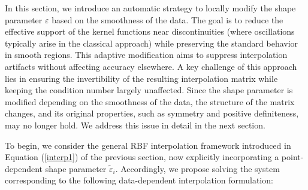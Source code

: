 \documentclass[preprint]{elsarticle}       %
\begin{document}


In this section, we introduce an automatic strategy to locally modify the shape parameter $\varepsilon$ based on the smoothness of the data. The goal is to reduce the effective support of the kernel functions near discontinuities (where oscillations typically arise in the classical approach) while preserving the standard behavior in smooth regions. This adaptive modification aims to suppress interpolation artifacts without affecting accuracy elsewhere. A key challenge of this approach lies in ensuring the invertibility of the resulting interpolation matrix while keeping the condition number largely unaffected. Since the shape parameter is modified depending on the smoothness of the data, the structure of the matrix changes, and its original properties, such as symmetry and positive definiteness, may no longer hold. We address this issue in detail in the next section.

To begin, we consider the general RBF interpolation framework introduced in Equation (\ref{interp1}) of the previous section, now explicitly incorporating a point-dependent shape parameter $\tilde{\varepsilon}_i$. Accordingly, we propose solving the system corresponding to the following data-dependent interpolation formulation:
\end{document}
